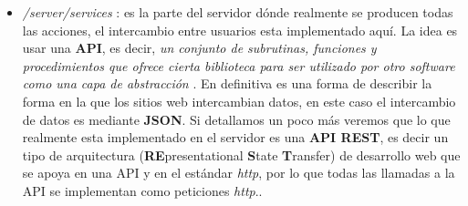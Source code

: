 \begin{itemize}
\begin{landscape}
  \end{landscape}

\item\emph{/server/services} : 	es la parte del servidor dónde realmente se producen todas las acciones, el intercambio entre usuarios esta implementado aquí. La idea es usar una \textbf{API}, es decir, \emph{un conjunto de subrutinas, funciones y procedimientos que ofrece cierta biblioteca para ser utilizado por otro software como una capa de abstracción} \cite{wikiapi}. En definitiva es una forma de describir la forma en la que los sitios web intercambian datos, en este caso el intercambio de datos es mediante \textbf{JSON}. Si detallamos un poco más veremos que lo que realmente esta implementado en el servidor es una \textbf{API REST}, es decir un tipo de arquitectura (\textbf{RE}presentational \textbf{S}tate \textbf{T}ransfer) de desarrollo web que se apoya en una API y en el estándar \emph{http}, por lo que todas las llamadas a la API se implementan como peticiones \emph{http}..
	
	
	
\end{itemize}



\begin{landscape}

  \end{landscape}

